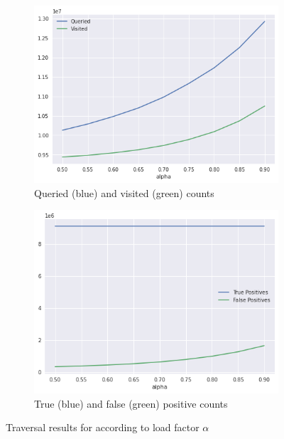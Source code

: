 \begin{figure}[htbp]
    \centering
    \begin{subfigure}{.5\textwidth}
        \centering
        \includegraphics[width=\textwidth]{figures/e_coli-dbht-queried_and_found}
        \caption{Queried (blue) and visited (green) counts}\label{fig:ecoli-art-dbht-traversal-queryfound}
    \end{subfigure}%
    \begin{subfigure}{.5\textwidth}
        \centering
        \includegraphics[width=\textwidth]{figures/e_coli-dbht-true_and_false_positive_counts}
        \caption{True (blue) and false (green) positive counts}\label{fig:ecoli-art-dbht-traversal-positives}
    \end{subfigure}
    \caption{Traversal results for \dBHT according to load factor $\alpha$}\label{fig:ecoli-art-dbcm-threshold}
\end{figure}

